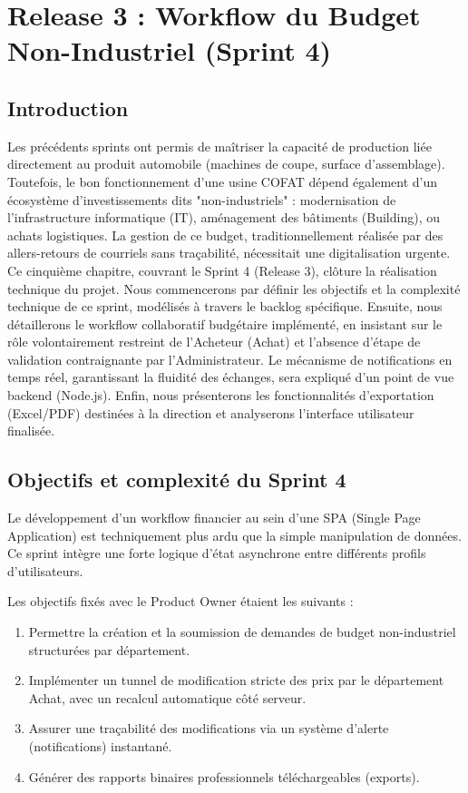 \chapter{Release 3 : Workflow du Budget Non-Industriel (Sprint 4)}
\label{chap:sprint_4}

\section{Introduction}
Les précédents sprints ont permis de maîtriser la capacité de production liée directement au produit automobile (machines de coupe, surface d'assemblage). Toutefois, le bon fonctionnement d'une usine COFAT dépend également d'un écosystème d'investissements dits "non-industriels" : modernisation de l'infrastructure informatique (IT), aménagement des bâtiments (Building), ou achats logistiques. La gestion de ce budget, traditionnellement réalisée par des allers-retours de courriels sans traçabilité, nécessitait une digitalisation urgente. Ce cinquième chapitre, couvrant le Sprint 4 (Release 3), clôture la réalisation technique du projet. Nous commencerons par définir les objectifs et la complexité technique de ce sprint, modélisés à travers le backlog spécifique. Ensuite, nous détaillerons le workflow collaboratif budgétaire implémenté, en insistant sur le rôle volontairement restreint de l'Acheteur (Achat) et l'absence d'étape de validation contraignante par l'Administrateur. Le mécanisme de notifications en temps réel, garantissant la fluidité des échanges, sera expliqué d'un point de vue backend (Node.js). Enfin, nous présenterons les fonctionnalités d'exportation (Excel/PDF) destinées à la direction et analyserons l'interface utilisateur finalisée.

\section{Objectifs et complexité du Sprint 4}
Le développement d'un workflow financier au sein d'une SPA (Single Page Application) est techniquement plus ardu que la simple manipulation de données. Ce sprint intègre une forte logique d'état asynchrone entre différents profils d'utilisateurs. 

Les objectifs fixés avec le Product Owner étaient les suivants :
\begin{enumerate}
    \item Permettre la création et la soumission de demandes de budget non-industriel structurées par département.
    \item Implémenter un tunnel de modification stricte des prix par le département Achat, avec un recalcul automatique côté serveur.
    \item Assurer une traçabilité des modifications via un système d'alerte (notifications) instantané.
    \item Générer des rapports binaires professionnels téléchargeables (exports).
\end{enumerate}

